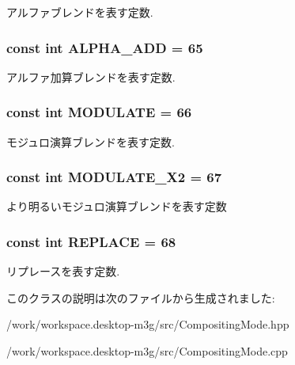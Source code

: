 アルファブレンドを表す定数. \hypertarget{classm3g_1_1CompositingMode_91ac80a5450e5f7f7e382860829030d9}{
\subsubsection[{ALPHA\_\-ADD}]{\setlength{\rightskip}{0pt plus 5cm}const int {\bf ALPHA\_\-ADD} = 65}}
\label{classm3g_1_1CompositingMode_91ac80a5450e5f7f7e382860829030d9}


アルファ加算ブレンドを表す定数. \hypertarget{classm3g_1_1CompositingMode_96b64c2847348fb73a90c4a501cda9d1}{
\subsubsection[{MODULATE}]{\setlength{\rightskip}{0pt plus 5cm}const int {\bf MODULATE} = 66}}
\label{classm3g_1_1CompositingMode_96b64c2847348fb73a90c4a501cda9d1}


モジュロ演算ブレンドを表す定数. \hypertarget{classm3g_1_1CompositingMode_cb426684e42a5ae425989c65fbb7dbc4}{
\subsubsection[{MODULATE\_\-X2}]{\setlength{\rightskip}{0pt plus 5cm}const int {\bf MODULATE\_\-X2} = 67}}
\label{classm3g_1_1CompositingMode_cb426684e42a5ae425989c65fbb7dbc4}


より明るいモジュロ演算ブレンドを表す定数 \hypertarget{classm3g_1_1CompositingMode_47a00ac5a59817a48db06fb2a538883c}{
\subsubsection[{REPLACE}]{\setlength{\rightskip}{0pt plus 5cm}const int {\bf REPLACE} = 68}}
\label{classm3g_1_1CompositingMode_47a00ac5a59817a48db06fb2a538883c}


リプレースを表す定数. 

このクラスの説明は次のファイルから生成されました:\begin{CompactItemize}
\item 
/work/workspace.desktop-m3g/src/CompositingMode.hpp\item 
/work/workspace.desktop-m3g/src/CompositingMode.cpp\end{CompactItemize}
